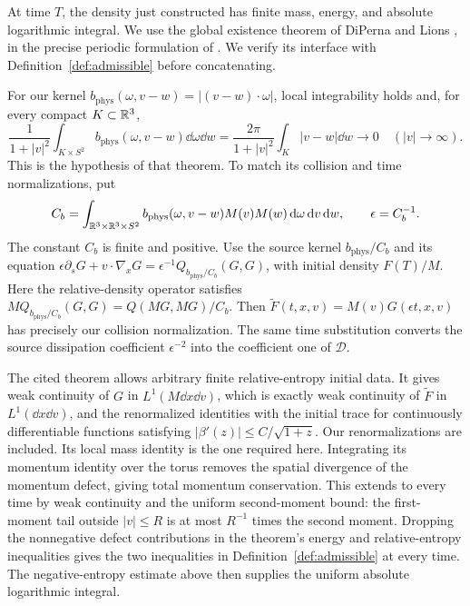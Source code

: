 At time \(T\), the density just constructed has finite mass, energy,
and absolute logarithmic integral. We use the global existence theorem
of DiPerna and Lions \cite{DiPernaLions1989,DiPernaLions1991}, in the
precise periodic formulation of
\cite[Section~4.1, Theorem~4.1]{LevermoreMasmoudi2010}. We verify its
interface with Definition~\ref{def:admissible} before concatenating.

For our kernel \(b_{\mathrm{phys}}(\omega,v-w)=|(v-w)\cdot\omega|\),
local integrability holds and, for every compact \(K\subset\mathbb R^3\),
\[
\frac1{1+|v|^2}\int_{K\times S^2}
 b_{\mathrm{phys}}(\omega,v-w)\dd\omega\dd w
=\frac{2\pi}{1+|v|^2}\int_K|v-w|\dd w\longrightarrow0
\quad(|v|\to\infty).
\]
This is the hypothesis of that theorem. To match its collision and time
normalizations, put
\[
C_b=\int_{\mathbb R^3\times\mathbb R^3\times S^2}
 b_{\mathrm{phys}}(\omega,v-w)M(v)M(w)\,\mathrm d\omega\,\mathrm d v\,\mathrm d w,
\qquad \epsilon=C_b^{-1}.
\]
The constant \(C_b\) is finite and positive. Use the source kernel
\(b_{\mathrm{phys}}/C_b\) and its equation
\(\epsilon\partial_sG+v\cdot\nabla_xG
=\epsilon^{-1}Q_{b_{\mathrm{phys}}/C_b}(G,G)\), with initial
density \(F(T)/M\). Here the relative-density operator satisfies
\(M Q_{b_{\mathrm{phys}}/C_b}(G,G)=Q(MG,MG)/C_b\).
Then \(\widetilde F(t,x,v)=M(v)G(\epsilon t,x,v)\) has precisely
our collision normalization. The same time substitution converts the
source dissipation coefficient \(\epsilon^{-2}\) into the coefficient
one of \(\mathcal D\).

The cited theorem allows arbitrary finite relative-entropy initial
data. It gives weak continuity of \(G\) in \(L^1(M\dd x\dd v)\),
which is exactly weak continuity of \(\widetilde F\) in
\(L^1(\dd x\dd v)\), and the renormalized identities with the initial
trace for continuously differentiable functions satisfying
\(|\beta'(z)|\le C/\sqrt{1+z}\). Our renormalizations are included.
Its local mass identity is the one required here. Integrating its
momentum identity over the torus removes the spatial divergence of
the momentum defect, giving total momentum conservation. This extends
to every time by weak continuity and the uniform second-moment bound:
the first-moment tail outside \(|v|\le R\) is at most \(R^{-1}\)
times the second moment. Dropping the nonnegative defect contributions
in the theorem's energy and relative-entropy inequalities gives the
two inequalities in Definition~\ref{def:admissible} at every time.
The negative-entropy estimate above then supplies the uniform absolute
logarithmic integral.

